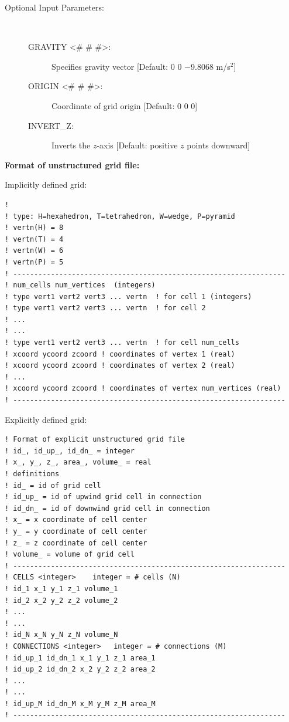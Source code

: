 \documentclass[12pt]{article}
\begin{document}
\begin{description}
\item[Optional Input Parameters:] ~

\begin{description}

\item[GRAVITY <\# \# \#>:] Specifies gravity vector [Default: 0 0 $-$9.8068 m/s$^2$]

\item[ORIGIN <\# \# \#>:] Coordinate of grid origin [Default: 0 0 0]

\item[INVERT\_Z:] Inverts the $z$-axis [Default: positive $z$ points downward]
\end{description}
\end{description}

\noindent
{\bf Format of unstructured grid file:}

Implicitly defined grid:
\begin{verbatim}
! 
! type: H=hexahedron, T=tetrahedron, W=wedge, P=pyramid
! vertn(H) = 8
! vertn(T) = 4
! vertn(W) = 6
! vertn(P) = 5
! -----------------------------------------------------------------
! num_cells num_vertices  (integers)
! type vert1 vert2 vert3 ... vertn  ! for cell 1 (integers)
! type vert1 vert2 vert3 ... vertn  ! for cell 2
! ...
! ...
! type vert1 vert2 vert3 ... vertn  ! for cell num_cells
! xcoord ycoord zcoord ! coordinates of vertex 1 (real)
! xcoord ycoord zcoord ! coordinates of vertex 2 (real)
! ...
! xcoord ycoord zcoord ! coordinates of vertex num_vertices (real)
! -----------------------------------------------------------------
\end{verbatim}

Explicitly defined grid:
  
\begin{verbatim}
! Format of explicit unstructured grid file
! id_, id_up_, id_dn_ = integer
! x_, y_, z_, area_, volume_ = real
! definitions
! id_ = id of grid cell
! id_up_ = id of upwind grid cell in connection
! id_dn_ = id of downwind grid cell in connection
! x_ = x coordinate of cell center
! y_ = y coordinate of cell center
! z_ = z coordinate of cell center
! volume_ = volume of grid cell
! -----------------------------------------------------------------
! CELLS <integer>    integer = # cells (N)
! id_1 x_1 y_1 z_1 volume_1
! id_2 x_2 y_2 z_2 volume_2
! ...
! ...
! id_N x_N y_N z_N volume_N
! CONNECTIONS <integer>   integer = # connections (M)
! id_up_1 id_dn_1 x_1 y_1 z_1 area_1
! id_up_2 id_dn_2 x_2 y_2 z_2 area_2
! ...
! ...
! id_up_M id_dn_M x_M y_M z_M area_M
! -----------------------------------------------------------------
\end{verbatim}
\end{document}

